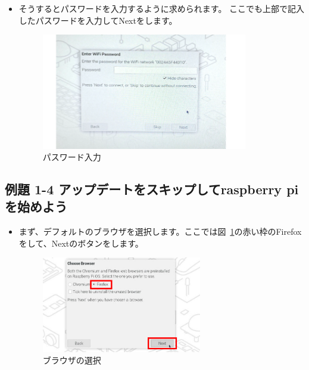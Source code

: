 \begin{itemize}
  \item そうするとパスワードを入力するように求められます。 ここでも上部で記入したパスワードを入力してNextをします。
  \begin{figure}[H]
    \centering
    \begin{minipage}{5.228cm}
      \includegraphics[width=9.000cm]{text01-img/pswd_image_0404.png}
      \caption{パスワード入力}
    \end{minipage}
  \end{figure}
\end{itemize}
\clearpage



% 
% 
\subsection*{例題 1-4 アップデートをスキップしてraspberry piを始めよう}
\begin{itemize}
  \item まず、デフォルトのブラウザを選択します。ここでは図~\ref{fig:16x}の赤い枠のFirefoxをして、Nextのボタンをします。
  \begin{figure}[h]
    \centering
    \begin{minipage}{5.228cm}
      \includegraphics[width=7.000cm]{text01-img/2024_image01.jpg}
      \caption{ブラウザの選択}\label{fig:16x}
    \end{minipage}
  \end{figure}
\end{itemize}

